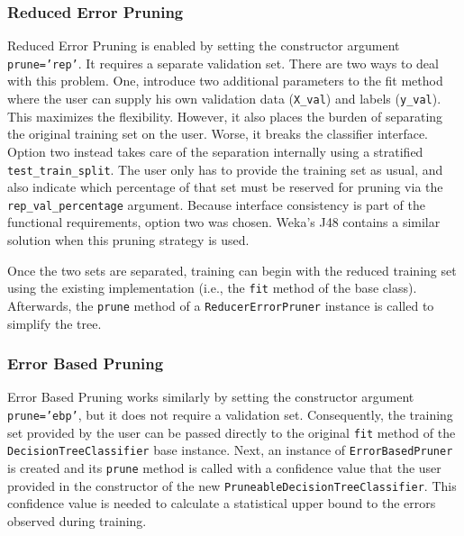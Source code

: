\subsubsection{Reduced Error Pruning}
Reduced Error Pruning is enabled by setting the constructor argument \texttt{prune='rep'}. It requires a separate validation set. There are two ways to deal with this problem. One, introduce two additional parameters to the fit method where the user can supply his own validation data (\texttt{X\_val}) and labels (\texttt{y\_val}). This maximizes the flexibility. However, it also places the burden of separating the original training set on the user. Worse, it breaks the classifier interface. Option two instead takes care of the separation internally using a stratified \texttt{test\_train\_split}. The user only has to provide the training set as usual, and also indicate which percentage of that set must be reserved for pruning via the \texttt{rep\_val\_percentage} argument. Because interface consistency is part of the functional requirements, option two was chosen. Weka's J48 contains a similar solution when this pruning strategy is used.

Once the two sets are separated, training can begin with the reduced training set using the existing implementation (i.e., the \texttt{fit} method of the base class). Afterwards, the \texttt{prune} method of a \texttt{ReducerErrorPruner} instance is called to simplify the tree.

\subsubsection{Error Based Pruning}
Error Based Pruning works similarly by setting the constructor argument \texttt{prune='ebp'}, but it does not require a validation set. Consequently, the training set provided by the user can be passed directly to the original \texttt{fit} method of the \texttt{DecisionTreeClassifier} base instance. Next, an instance of \texttt{ErrorBasedPruner} is created and its \texttt{prune} method is called with a confidence value that the user provided in the constructor of the new \texttt{PruneableDecisionTreeClassifier}. This confidence value is needed to calculate a statistical upper bound to the errors observed during training.



